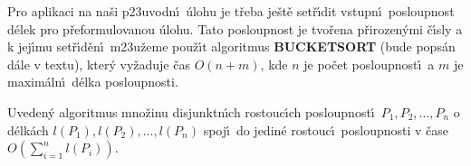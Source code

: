 \flushpar Pro aplikaci na na\v si p\accent23uvodn\'\i\ \'ulohu je 
t\v reba  
je\v st\v e set\v r\'\i dit vstupn\'\i\ posloupnost d\'elek pro p\v reformu\-lo\-vanou \'ulohu.
Tato posloupnost je tvo\v rena p\v rirozen\'ymi \v c\'\i sly a 
k jej\'\i mu set\v r\'\i d\v en\'\i\  
m\accent23u\v zeme pou\v z\'\i t algoritmus {\bf BUCKETSORT} (bude 
pops\'an d\'ale v textu), kter\'y 
vy\v zaduje \v cas $O(n+m)$, kde $n$ je po\v cet posloupnost\'\i\ a $
m$ je 
maxim\'aln\'\i\ d\'elka posloupnosti.
\medskip

Uveden\'y algoritmus mno\v zinu 
disjunktn\'\i ch rostouc\'\i ch 
posloupnost\'\i\ $P_1,P_2,\dots,P_n$ o d\'elk\'ach $l(P_1),l(P_2)
,\dots,l(P_n)$ spoj\'\i\ 
do jedin\'e rostouc\'\i\ posloupnosti v \v case 
$O(\sum_{i=1}^nl(P_i))$.
\endproclaim
\bigskip

\centerline{}
\medskip

